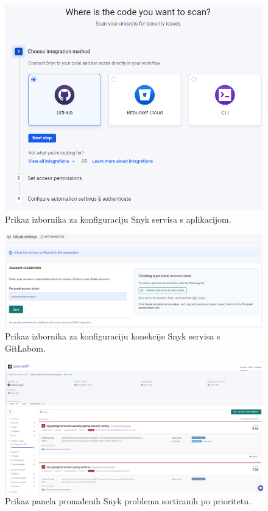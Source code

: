 \documentclass[a4paper,12pt,oneside]{article}
\begin{document}
\begin{figure}
    \centering
    \includegraphics[width=0.6\linewidth]{Slike/snyk-select-git.png}
    \caption{Prikaz izbornika za konfiguraciju Snyk servisa s aplikacijom.\cite{snyk}}
    \label{fig:snyk-select-git}
\end{figure}

\begin{figure}
    \centering
    \includegraphics[width=1\linewidth]{Slike/snyk-gitlab-token.png}
    \caption{Prikaz izbornika za konfiguraciju konekcije Snyk servisa s GitLabom.\cite{snyk}}
    \label{fig:snyk-gitlab-token}
\end{figure}

\begin{figure}
    \centering
    \includegraphics[width=1\linewidth]{Slike/snyk-issues.png}
    \caption{Prikaz panela pronađenih Snyk problema sortiranih po prioritetu.\cite{snyk}}
    \label{fig:snyk-issues}
\end{figure}
\end{document}
